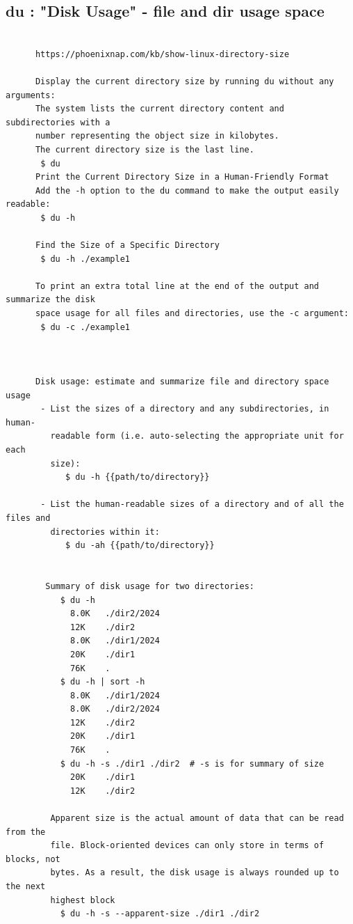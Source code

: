 \documentclass[a4paper,12pt]{article}
\begin{document}
\subsection{du       : "Disk Usage" - file and dir usage space}
\begin{verbatim}
      
      https://phoenixnap.com/kb/show-linux-directory-size
      
      Display the current directory size by running du without any arguments:
      The system lists the current directory content and subdirectories with a    
      number representing the object size in kilobytes. 
      The current directory size is the last line.
       $ du
      Print the Current Directory Size in a Human-Friendly Format
      Add the -h option to the du command to make the output easily readable:
       $ du -h
      
      Find the Size of a Specific Directory
       $ du -h ./example1
      
      To print an extra total line at the end of the output and summarize the disk     
      space usage for all files and directories, use the -c argument:
       $ du -c ./example1
      
      
      
      Disk usage: estimate and summarize file and directory space usage
       - List the sizes of a directory and any subdirectories, in human-   
         readable form (i.e. auto-selecting the appropriate unit for each
         size):
            $ du -h {{path/to/directory}}

       - List the human-readable sizes of a directory and of all the files and 
         directories within it:
            $ du -ah {{path/to/directory}}


        Summary of disk usage for two directories:
           $ du -h
             8.0K	./dir2/2024
             12K	./dir2
             8.0K	./dir1/2024
             20K	./dir1
             76K	.
           $ du -h | sort -h
             8.0K	./dir1/2024
             8.0K	./dir2/2024
             12K	./dir2
             20K	./dir1
             76K	.
           $ du -h -s ./dir1 ./dir2  # -s is for summary of size
             20K	./dir1
             12K	./dir2
             
         Apparent size is the actual amount of data that can be read from the 
         file. Block-oriented devices can only store in terms of blocks, not 
         bytes. As a result, the disk usage is always rounded up to the next 
         highest block     
           $ du -h -s --apparent-size ./dir1 ./dir2  
            
            
             
\end{verbatim}
\end{document}
